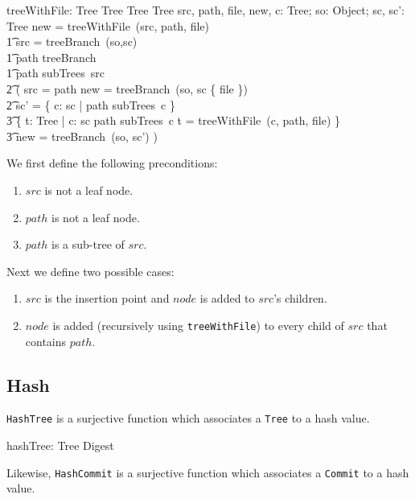 \begin{axdef}
  treeWithFile: Tree \cross Tree \cross Tree \pfun Tree
\where
  \exists src, path, file, new, c: Tree; so: Object; sc, sc': \finset Tree \spot new = treeWithFile~(src, path, file) \iff \\
  \t1 src = treeBranch~(so,sc) \land \\
  \t1 path \in \ran treeBranch \land \\
  \t1 path \in subTrees~src \land \\
    \t2 ( src = path \land new = treeBranch~(so, sc \cup \{ file \}) \lor \\
    \t2 sc' = \{ c: sc | path \notin subTrees~c \} \cup \\
      \t3 \{ t: Tree | \forall c: sc \spot path \in subTrees~c \land t = treeWithFile~(c, path, file) \} \land \\
      \t3 new = treeBranch~(so, sc') )
\end{axdef}

We first define the following preconditions:

\begin{enumerate}
  \item $src$ is not a leaf node.
  \item $path$ is not a leaf node.
  \item $path$ is a sub-tree of $src$.
\end{enumerate}

Next we define two possible cases:

\begin{enumerate}
  \item $src$ is the insertion point and $node$ is added to $src$'s children.
  \item $node$ is added (recursively using \texttt{treeWithFile}) to every child
  of $src$ that contains $path$.
\end{enumerate}

\subsection{Hash}

\texttt{HashTree} is a surjective function which associates a \texttt{Tree} to a
hash value.

\begin{axdef}
  hashTree: Tree \surj Digest
\end{axdef}

Likewise, \texttt{HashCommit} is a surjective function which associates a
\texttt{Commit} to a hash value.

